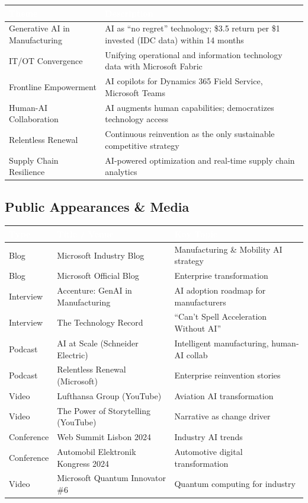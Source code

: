 \documentclass[11pt,a4paper]{article}
\begin{document}
\begin{center}
\begin{longtable}{L{4.5cm}L{9cm}}
\toprule
{}
\textcolor{white}{\textbf{Theme}} & \textcolor{white}{\textbf{Description}} \\
\midrule
Generative AI in Manufacturing & AI as ``no regret'' technology; \$3.5 return per \$1 invested (IDC data) within 14 months \\
IT/OT Convergence & Unifying operational and information technology data with Microsoft Fabric \\
Frontline Empowerment & AI copilots for Dynamics 365 Field Service, Microsoft Teams \\
Human-AI Collaboration & AI augments human capabilities; democratizes technology access \\
Relentless Renewal & Continuous reinvention as the only sustainable competitive strategy \\
Supply Chain Resilience & AI-powered optimization and real-time supply chain analytics \\
\bottomrule
\end{longtable}
\end{center}

\subsection{Public Appearances \& Media}

\begin{center}
\begin{longtable}{L{2.5cm}L{5.5cm}L{5.5cm}}
\toprule
{}
\textcolor{white}{\textbf{Type}} & \textcolor{white}{\textbf{Title / Venue}} & \textcolor{white}{\textbf{Key Topic}} \\
\midrule
Blog & Microsoft Industry Blog & Manufacturing \& Mobility AI strategy \\
Blog & Microsoft Official Blog & Enterprise transformation \\
Interview & Accenture: GenAI in Manufacturing & AI adoption roadmap for manufacturers \\
Interview & The Technology Record & ``Can't Spell Acceleration Without AI'' \\
Podcast & AI at Scale (Schneider Electric) & Intelligent manufacturing, human-AI collab \\
Podcast & Relentless Renewal (Microsoft) & Enterprise reinvention stories \\
Video & Lufthansa Group (YouTube) & Aviation AI transformation \\
Video & The Power of Storytelling (YouTube) & Narrative as change driver \\
Conference & Web Summit Lisbon 2024 & Industry AI trends \\
Conference & Automobil Elektronik Kongress 2024 & Automotive digital transformation \\
Video & Microsoft Quantum Innovator \#6 & Quantum computing for industry \\
\bottomrule
\end{longtable}
\end{center}
\end{document}
